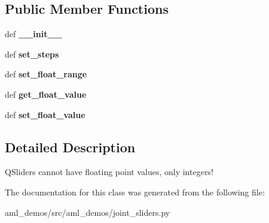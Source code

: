 \subsection*{Public Member Functions}
\begin{DoxyCompactItemize}
\item 
\hypertarget{classaml__demos_1_1joint__sliders_1_1_float_slider_a49b5269d0771d8dfbe177386b6d4d09d}{def {\bfseries \-\_\-\-\_\-init\-\_\-\-\_\-}}\label{classaml__demos_1_1joint__sliders_1_1_float_slider_a49b5269d0771d8dfbe177386b6d4d09d}

\item 
\hypertarget{classaml__demos_1_1joint__sliders_1_1_float_slider_a734027237e6e51bbb65191745d18a3e8}{def {\bfseries set\-\_\-steps}}\label{classaml__demos_1_1joint__sliders_1_1_float_slider_a734027237e6e51bbb65191745d18a3e8}

\item 
\hypertarget{classaml__demos_1_1joint__sliders_1_1_float_slider_a441a7c8bfdd12df7938c506162473b7a}{def {\bfseries set\-\_\-float\-\_\-range}}\label{classaml__demos_1_1joint__sliders_1_1_float_slider_a441a7c8bfdd12df7938c506162473b7a}

\item 
\hypertarget{classaml__demos_1_1joint__sliders_1_1_float_slider_aa177212c9b6e56e344456858cd11d47c}{def {\bfseries get\-\_\-float\-\_\-value}}\label{classaml__demos_1_1joint__sliders_1_1_float_slider_aa177212c9b6e56e344456858cd11d47c}

\item 
\hypertarget{classaml__demos_1_1joint__sliders_1_1_float_slider_a1eaa951a2cc15c5ae1f5a77ec8013624}{def {\bfseries set\-\_\-float\-\_\-value}}\label{classaml__demos_1_1joint__sliders_1_1_float_slider_a1eaa951a2cc15c5ae1f5a77ec8013624}

\end{DoxyCompactItemize}


\subsection{Detailed Description}
\begin{DoxyVerb}QSliders cannot have floating point values, only integers! \end{DoxyVerb}
 

The documentation for this class was generated from the following file\-:\begin{DoxyCompactItemize}
\item 
aml\-\_\-demos/src/aml\-\_\-demos/joint\-\_\-sliders.\-py\end{DoxyCompactItemize}
